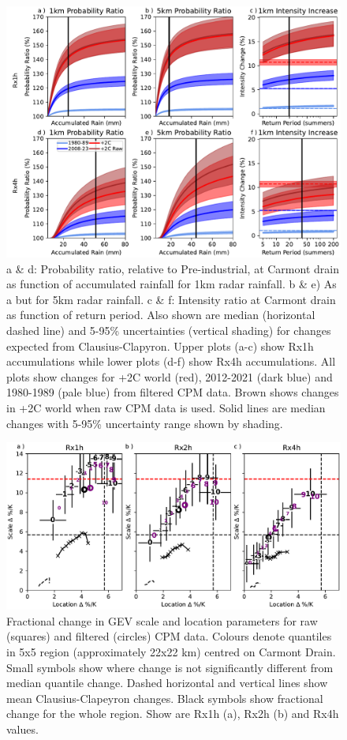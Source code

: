 \documentclass[11pt,a4paper]{article}
\begin{document}
\begin{figure}
	\centering
	\includegraphics[width=1\linewidth]{intens_prob_ratios}
	\caption{a \& d: Probability ratio, relative to Pre-industrial, at Carmont drain as function of accumulated rainfall for 1km radar rainfall. b \& e) As a but for 5km radar rainfall. c \& f: Intensity ratio at Carmont drain  as function of  return period. Also shown are median (horizontal dashed line) and 5-95\% uncertainties (vertical shading) for changes expected from Clausius-Clapyron. Upper plots (a-c) show Rx1h accumulations while lower plots (d-f) show Rx4h accumulations. All plots show changes for +2C world (red), 2012-2021 (dark blue) and 1980-1989 (pale blue) from filtered CPM data. Brown shows changes in +2C world when raw CPM data is used.   Solid lines are median changes with 5-95\% uncertainty range shown by  shading.}
	\label{fig:int_pr}
\end{figure}

\begin{figure}
	\centering
	\includegraphics[width=\linewidth]{carmont_gev_quant_change}
	\caption{Fractional change in GEV scale  and location parameters for raw (squares) and filtered (circles) CPM data. Colours denote quantiles in 5x5 region (approximately 22x22 km) centred on Carmont Drain. Small symbols show where change is not significantly different from median quantile change. Dashed horizontal and vertical lines show mean Clausius-Clapeyron changes. Black symbols show fractional change for the whole region.  Show are Rx1h (a), Rx2h (b) and Rx4h values.}
	\label{fig:carmon_gev_quant_change}
\end{figure}
\end{document}
